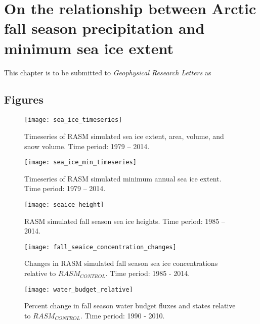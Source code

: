 \chapter{On the relationship between Arctic fall season precipitation and minimum sea ice extent}
\label{chap:fall_prec_sup}

This chapter is to be submitted to \textit{Geophysical Research Letters} as


\section{Figures}

\begin{figure}
    \centering
    \texttt{[image: sea\_ice\_timeseries]}
    \caption{Timeseries of RASM simulated sea ice extent, area, volume, and snow volume. Time period: 1979 – 2014.}
    \label{fig:sea_ice_ts_sup}
\end{figure}

\begin{figure}
    \centering
    \texttt{[image: sea\_ice\_min\_timeseries]}
    \caption{Timeseries of RASM simulated minimum annual sea ice extent. Time period: 1979 – 2014.}
    \label{fig:sea_ice_min_ts_sup}
\end{figure}

\begin{figure}
    \centering
    \texttt{[image: seaice\_height]}
    \caption{RASM simulated fall season sea ice heights. Time period: 1985 – 2014.}
    \label{fig:sea_ice_height_sup}
\end{figure}

\begin{figure}
    \centering
    \texttt{[image: fall\_seaice\_concentration\_changes]}
    \caption{Changes in RASM simulated fall season sea ice concentrations relative to $RASM_{CONTROL}$.
    Time period: 1985 - 2014.}
    \label{fig:sea_ice_conc_sup}
\end{figure}

\begin{figure}
    \centering
    \texttt{[image: water\_budget\_relative]}
    \caption{Percent change in fall season water budget fluxes and states relative to $RASM_{CONTROL}$.
    Time period: 1990 - 2010.}
    \label{fig:relative_fwb_change_sup}
\end{figure}

